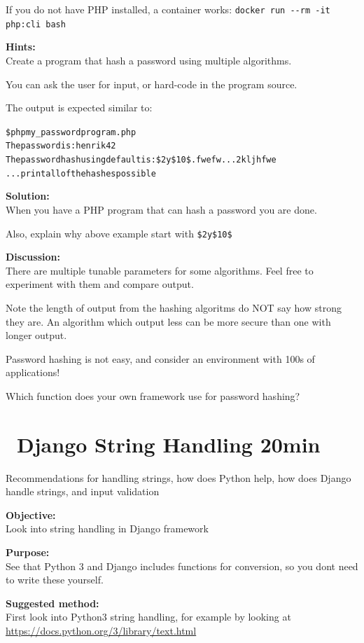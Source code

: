 \documentclass[a4paper,11pt,notitlepage]{report}
\begin{document}
If you do not have PHP installed, a container works: \verb+docker run --rm -it php:cli bash+

{\bf Hints:}\\
Create a program that hash a password using multiple algorithms.

You can ask the user for input, or hard-code in the program source.

The output is expected similar to:

\begin{alltt}
\$ php my_passwordprogram.php
The password is: henrik42
The password hash using default is: \$2y\$10\$.fwefw...2kljhfwe
... print all of the hashes possible
\end{alltt}

{\bf Solution:}\\
When you have a PHP program that can hash a password you are done.

Also, explain why above example start with \verb+$2y$10$+

{\bf Discussion:}\\
There are multiple tunable parameters for some algorithms. Feel free to experiment with them and compare output.

Note the length of output from the hashing algoritms do NOT say how strong they are. An algorithm which output less can be more secure than one with longer output.

Password hashing is not easy, and consider an environment with 100s of applications!

Which function does your own framework use for password hashing?


\chapter{\faInfoCircle\ Django String Handling 20min}
\label{ex:django-string}

Recommendations for handling strings, how does Python help, how does Django handle strings, and input validation

{\bf Objective:}\\
Look into string handling in Django framework

{\bf Purpose:}\\
See that Python 3 and Django includes functions for conversion, so you dont need to write these yourself.

{\bf Suggested method:}\\
First look into Python3 string handling, for example by looking at\\
\url{https://docs.python.org/3/library/text.html}
\end{document}
